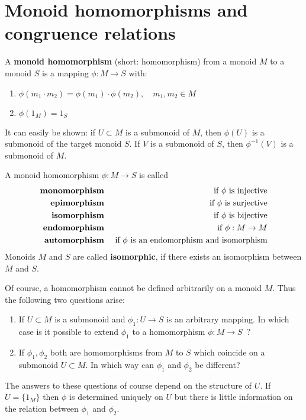 \section{Monoid homomorphisms and congruence relations}

\begin{definition}
A {\bf monoid homomorphism} (short: homomorphism) from a monoid $M$ to a monoid
$S$ is a mapping $\phi : M \to S$ with:
\begin{enumerate}
  \item $\phi(m_1 \cdot m_2) = \phi(m_1) \cdot \phi(m_2), \quad m_1, m_2 \in M$
  \item $\phi(1_M) = 1_S$
\end{enumerate}
\end{definition}

It can easily be shown: if $U \subset M$ is a submonoid of $M$, then
$\phi(U)$ is a submonoid of the target monoid $S$. If $V$ is a submonoid of $S$,
then $\phi^{-1}(V)$ is a submonoid of $M$.

A monoid homomorphism $\phi: M \to S$ is called
\begin{eqnarray*}
\text{\bf monomorphism} & & \text{ if $\phi$ is injective} \\
\text{\bf epimorphism} & & \text{ if $\phi$ is surjective} \\
\text{\bf isomorphism} & & \text{ if $\phi$ is bijective} \\
\text{\bf endomorphism} & & \text{ if $\phi: M\to M$} \\
\text{\bf automorphism} & & \text{ if $\phi$ is an endomorphism and isomorphism}
\end{eqnarray*}
Monoids $M$ and $S$ are called {\bf isomorphic}, if there exists an
isomorphism between $M$ and $S$.

Of course, a homomorphism cannot be defined arbitrarily on a monoid $M$.
Thus the following two questions arise:
\begin{enumerate}
  \item If $U \subset M$ is a submonoid and $\phi_1 : U \to S$ is an arbitrary
mapping. In which case is it possible to extend $\phi_1$ to a homomorphism $\phi
: M \to S$\ ?
	\item If $\phi_1, \phi_2$ both are homomorphisms from $M$ to $S$ which
	coincide on a submonoid $U \subset M$. In which way can $\phi_1$ and $\phi_2$
	be different? 
\end{enumerate}

The answers to these questions of course depend on the structure of $U$. If
$U = \{ 1_M \}$ then $\phi$ is determined uniquely on $U$ but there is
little information on the relation between $\phi_1$ and $\phi_2$.


